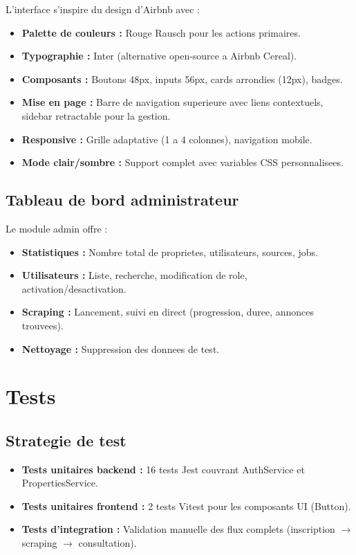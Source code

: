 \documentclass[12pt,a4paper]{report}
\begin{document}
L'interface s'inspire du design d'Airbnb avec :
\begin{itemize}
  \item \textbf{Palette de couleurs :} Rouge Rausch pour les actions primaires.
  \item \textbf{Typographie :} Inter (alternative open-source a Airbnb Cereal).
  \item \textbf{Composants :} Boutons 48px, inputs 56px, cards arrondies (12px), badges.
  \item \textbf{Mise en page :} Barre de navigation superieure avec liens contextuels, sidebar retractable pour la gestion.
  \item \textbf{Responsive :} Grille adaptative (1 a 4 colonnes), navigation mobile.
  \item \textbf{Mode clair/sombre :} Support complet avec variables CSS personnalisees.
\end{itemize}

\section{Tableau de bord administrateur}

Le module admin offre :
\begin{itemize}
  \item \textbf{Statistiques :} Nombre total de proprietes, utilisateurs, sources, jobs.
  \item \textbf{Utilisateurs :} Liste, recherche, modification de role, activation/desactivation.
  \item \textbf{Scraping :} Lancement, suivi en direct (progression, duree, annonces trouvees).
  \item \textbf{Nettoyage :} Suppression des donnees de test.
\end{itemize}

\chapter{Tests}

\section{Strategie de test}

\begin{itemize}
  \item \textbf{Tests unitaires backend :} 16 tests Jest couvrant AuthService et PropertiesService.
  \item \textbf{Tests unitaires frontend :} 2 tests Vitest pour les composants UI (Button).
  \item \textbf{Tests d'integration :} Validation manuelle des flux complets (inscription $\rightarrow$ scraping $\rightarrow$ consultation).
\end{itemize}
\end{document}

